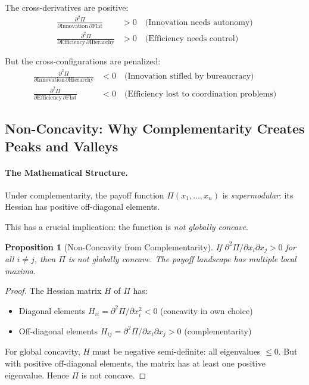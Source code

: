 \documentclass[12pt,a4paper]{article}
\newtheorem{proposition}[theorem]{Proposition}
\begin{document}
The cross-derivatives are positive:
\begin{align}
  \frac{\partial^2 \Pi}{\partial \text{Innovation} \, \partial \text{Flat}} &> 0 
  \quad \text{(Innovation needs autonomy)} \\
  \frac{\partial^2 \Pi}{\partial \text{Efficiency} \, \partial \text{Hierarchy}} &> 0 
  \quad \text{(Efficiency needs control)}
\end{align}

But the cross-configurations are penalized:
\begin{align}
  \frac{\partial^2 \Pi}{\partial \text{Innovation} \, \partial \text{Hierarchy}} &< 0 
  \quad \text{(Innovation stifled by bureaucracy)} \\
  \frac{\partial^2 \Pi}{\partial \text{Efficiency} \, \partial \text{Flat}} &< 0 
  \quad \text{(Efficiency lost to coordination problems)}
\end{align}

\subsection{Non-Concavity: Why Complementarity Creates Peaks and Valleys}

\paragraph{The Mathematical Structure.}
Under complementarity, the payoff function $\Pi(x_1, \ldots, x_n)$ is 
\emph{supermodular}: its Hessian has positive off-diagonal elements.

This has a crucial implication: the function is \emph{not globally concave}.

\begin{proposition}[Non-Concavity from Complementarity]
\label{prop:nonconcavity}
If $\partial^2 \Pi / \partial x_i \partial x_j > 0$ for all $i \neq j$,
then $\Pi$ is not globally concave.
The payoff landscape has multiple local maxima.
\end{proposition}

\begin{proof}
The Hessian matrix $H$ of $\Pi$ has:
\begin{itemize}
  \item Diagonal elements $H_{ii} = \partial^2 \Pi / \partial x_i^2 < 0$ (concavity in own choice)
  \item Off-diagonal elements $H_{ij} = \partial^2 \Pi / \partial x_i \partial x_j > 0$ (complementarity)
\end{itemize}

For global concavity, $H$ must be negative semi-definite: all eigenvalues $\leq 0$.
But with positive off-diagonal elements, the matrix has at least one positive eigenvalue.
Hence $\Pi$ is not concave.
\end{proof}
\end{document}
